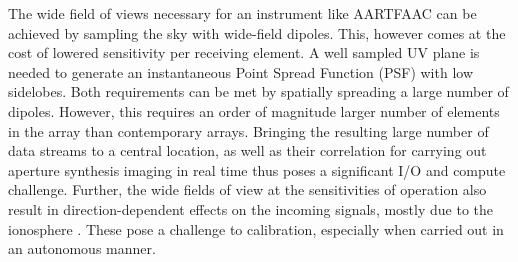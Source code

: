 \documentclass{ws-jai}
\begin{document}
The  wide field  of  views necessary  for  an instrument  like  AARTFAAC can  be
achieved by sampling the sky with wide-field dipoles. This, however comes at the
cost of lowered  sensitivity per receiving element.  A well  sampled UV plane is
needed  to  generate an  instantaneous  Point  Spread  Function (PSF)  with  low
sidelobes.  Both requirements  can be met by spatially spreading  a large number
of  dipoles.  However,  this requires  an order  of magnitude  larger number  of
elements in  the array than  contemporary arrays.  Bringing the  resulting large
number of data streams  to a central location, as well  as their correlation for
carrying out  aperture synthesis imaging in  real time thus poses  a significant
I/O and compute challenge. Further, the wide fields of view at the sensitivities
of operation also result in direction-dependent effects on the incoming signals,
mostly              due              to              the              ionosphere
\citep{intema2009ionospheric,wijnholds2010calibration}.  These  pose a challenge
to calibration, especially when carried out in an autonomous manner.


\end{document}

